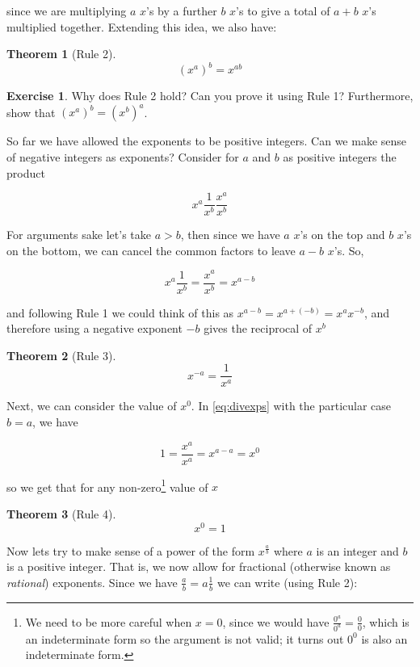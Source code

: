 \documentclass[
]{book}
\newtheorem{theorem}{Theorem}[chapter]
\theoremstyle{definition}
\theoremstyle{definition}
\theoremstyle{definition}
\newtheorem{exercise}{Exercise}[chapter]
\theoremstyle{definition}
\theoremstyle{remark}
\begin{document}
since we are multiplying \(a\) \(x\)'s by a further \(b\) \(x\)'s to give a total of \(a+b\) \(x\)'s multiplied together. Extending this idea, we also have:

\begin{theorem}[Rule 2]
\protect\hypertarget{thm:exprule1}{}\label{thm:exprule1}\[(x^a)^b=x^{ab}\]
\end{theorem}

\begin{exercise}
\protect\hypertarget{exr:rule2}{}\label{exr:rule2}Why does Rule 2 hold? Can you prove it using Rule 1? Furthermore, show that \((x^a)^b=(x^b)^a\).
\end{exercise}

So far we have allowed the exponents to be positive integers. Can we make sense of negative integers as exponents? Consider for \(a\) and \(b\) as positive integers the product

\[x^a\frac{1}{x^b}\frac{x^a}{x^b}\]

For arguments sake let's take \(a>b\), then since we have \(a\) \(x\)'s on the top and \(b\) \(x\)'s on the bottom, we can cancel the common factors to leave \(a-b\) \(x\)'s. So,

\begin{equation}
x^a\frac{1}{x^b}=\frac{x^a}{x^b}=x^{a-b} \label{eq:divexps}
\end{equation}

and following Rule 1 we could think of this as \(x^{a-b}=x^{a+(-b)}=x^ax^{-b}\), and therefore using a negative exponent \(-b\) gives the reciprocal of \(x^b\)

\begin{theorem}[Rule 3]
\protect\hypertarget{thm:exprule1}{}\label{thm:exprule1}\[x^{-a}=\frac{1}{x^a}\]
\end{theorem}

Next, we can consider the value of \(x^0\). In \eqref{eq:divexps} with the particular case \(b=a\), we have

\[1=\frac{x^a}{x^a}=x^{a-a}=x^0\]

so we get that for any non-zero\footnote{We need to be more careful when \(x=0\), since we would have \(\frac{0^a}{0^a}=\frac{0}{0}\), which is an indeterminate form so the argument is not valid; it turns out \(0^0\) is also an indeterminate form.} value of \(x\)

\begin{theorem}[Rule 4]
\[x^0=1\]
\end{theorem}

Now lets try to make sense of a power of the form \(x^{\frac{a}{b}}\) where \(a\) is an integer and \(b\) is a positive integer. That is, we now allow for fractional (otherwise known as \emph{rational}) exponents. Since we have \(\frac{a}{b}=a\frac{1}{b}\) we can write (using Rule 2):
\end{document}
